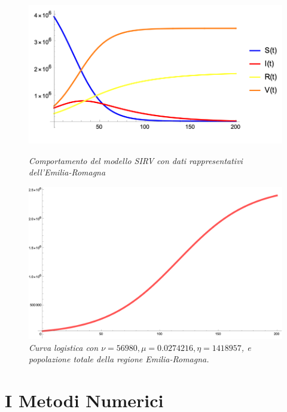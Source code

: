 \documentclass{article}
\begin{document}
\begin{figure}[h!]
\centering
\begin{minipage}[t]{.4\paperwidth}
    \hspace{-10pt}
    \includegraphics[width=\textwidth]{SIRV.png}
    \caption{\textit{Comportamento del modello SIRV con dati 
    rappresentativi dell'Emilia-Romagna}}
    \label{fig::SIRV}
    \end{minipage}%
\hfill %
\begin{minipage}[t]{.4\paperwidth}
    \hspace{-10pt}
    \includegraphics[width=\textwidth]{vaccinati.png}
    \caption{\textit{Curva logistica con $\nu=56980, 
    \mu=0.0274216, \eta=1418957$, e popolazione totale della regione 
    Emilia-Romagna.}}
    \label{fig::vaccinati}
\end{minipage}
\end{figure}

\section{I Metodi Numerici}
\end{document}
